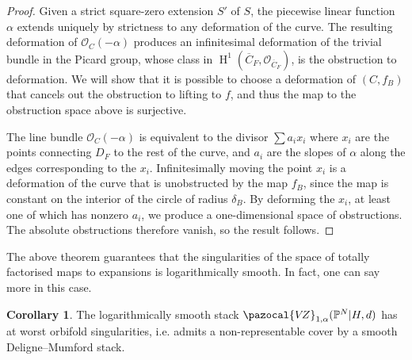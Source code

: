 \documentclass[11pt]{amsart}
\newcommand{\VZ}{\pazocal{V\!Z}}
\renewcommand{\to}{\rightarrow}
\newcommand{\HH}{\operatorname{H}}
\theoremstyle{definition}
\newtheorem{cor}[thm]{Corollary}
\theoremstyle{definition}
\begin{document}
\begin{proof}
Given a strict square-zero extension $S'$ of $S$, the piecewise linear function $\alpha$ extends uniquely by strictness to any deformation of the curve. The resulting deformation of $\mathcal O_{C}(-\alpha)$ produces an infinitesimal deformation of the trivial bundle in the Picard group, whose class in $\HH^1(\overline{C}_F,\mathcal O_{\overline{C}_F})$, is the obstruction to deformation. We will show that it is possible to choose a deformation of $(C,f_B)$ that cancels out the obstruction to lifting to $f$, and thus the map to the obstruction space above is surjective. 

The line bundle $\mathcal O_{C}(-\alpha)$ is equivalent to the divisor $\sum a_i x_i$ where $x_i$ are the points connecting $D_F$ to the rest of the curve, and $a_i$ are the slopes of $\alpha$ along the edges corresponding to the $x_i$. Infinitesimally moving the point $x_i$ is a deformation of the curve that is unobstructed by the map $f_B$, since the map is constant on the interior of the circle of radius $\delta_B$. By deforming the $x_i$, at least one of which has nonzero $a_i$, we produce a one-dimensional space of obstructions. The absolute obstructions therefore vanish, so the result follows.  
\end{proof}

The above theorem guarantees that the singularities of the space of totally factorised maps to expansions is logarithmically smooth. In fact, one can say more in this case.

\begin{cor}
The logarithmically smooth stack $\VZ_{1,\alpha}(\mathbb P^N|H,d)$ has at worst orbifold singularities, i.e. admits a non-representable cover by a smooth Deligne--Mumford stack.
\end{cor}
\end{document}
